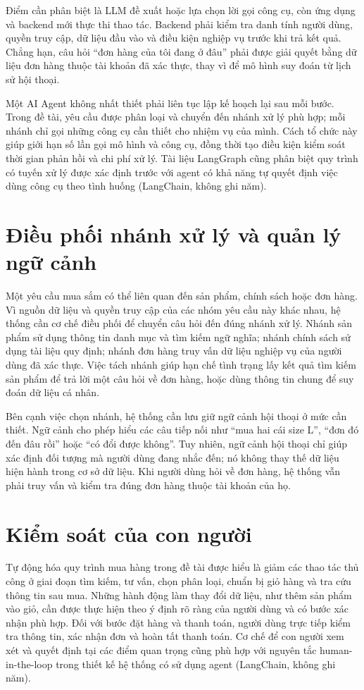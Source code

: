 \documentclass[12pt,a4paper,oneside]{report}
\begin{document}
Điểm cần phân biệt là LLM đề xuất hoặc lựa chọn lời gọi công cụ, còn ứng dụng và backend mới thực thi thao tác. Backend phải kiểm tra danh tính người dùng, quyền truy cập, dữ liệu đầu vào và điều kiện nghiệp vụ trước khi trả kết quả. Chẳng hạn, câu hỏi “đơn hàng của tôi đang ở đâu” phải được giải quyết bằng dữ liệu đơn hàng thuộc tài khoản đã xác thực, thay vì để mô hình suy đoán từ lịch sử hội thoại.

Một AI Agent không nhất thiết phải liên tục lập kế hoạch lại sau mỗi bước. Trong đề tài, yêu cầu được phân loại và chuyển đến nhánh xử lý phù hợp; mỗi nhánh chỉ gọi những công cụ cần thiết cho nhiệm vụ của mình. Cách tổ chức này giúp giới hạn số lần gọi mô hình và công cụ, đồng thời tạo điều kiện kiểm soát thời gian phản hồi và chi phí xử lý. Tài liệu LangGraph cũng phân biệt quy trình có tuyến xử lý được xác định trước với agent có khả năng tự quyết định việc dùng công cụ theo tình huống (LangChain, không ghi năm). \cite{langgraphworkflow}

\section{Điều phối nhánh xử lý và quản lý ngữ cảnh}
Một yêu cầu mua sắm có thể liên quan đến sản phẩm, chính sách hoặc đơn hàng. Vì nguồn dữ liệu và quyền truy cập của các nhóm yêu cầu này khác nhau, hệ thống cần cơ chế điều phối để chuyển câu hỏi đến đúng nhánh xử lý. Nhánh sản phẩm sử dụng thông tin danh mục và tìm kiếm ngữ nghĩa; nhánh chính sách sử dụng tài liệu quy định; nhánh đơn hàng truy vấn dữ liệu nghiệp vụ của người dùng đã xác thực. Việc tách nhánh giúp hạn chế tình trạng lấy kết quả tìm kiếm sản phẩm để trả lời một câu hỏi về đơn hàng, hoặc dùng thông tin chung để suy đoán dữ liệu cá nhân.

Bên cạnh việc chọn nhánh, hệ thống cần lưu giữ ngữ cảnh hội thoại ở mức cần thiết. Ngữ cảnh cho phép hiểu các câu tiếp nối như “mua hai cái size L”, “đơn đó đến đâu rồi” hoặc “có đổi được không”. Tuy nhiên, ngữ cảnh hội thoại chỉ giúp xác định đối tượng mà người dùng đang nhắc đến; nó không thay thế dữ liệu hiện hành trong cơ sở dữ liệu. Khi người dùng hỏi về đơn hàng, hệ thống vẫn phải truy vấn và kiểm tra đúng đơn hàng thuộc tài khoản của họ.

\section{Kiểm soát của con người}
Tự động hóa quy trình mua hàng trong đề tài được hiểu là giảm các thao tác thủ công ở giai đoạn tìm kiếm, tư vấn, chọn phân loại, chuẩn bị giỏ hàng và tra cứu thông tin sau mua. Những hành động làm thay đổi dữ liệu, như thêm sản phẩm vào giỏ, cần được thực hiện theo ý định rõ ràng của người dùng và có bước xác nhận phù hợp. Đối với bước đặt hàng và thanh toán, người dùng trực tiếp kiểm tra thông tin, xác nhận đơn và hoàn tất thanh toán. Cơ chế để con người xem xét và quyết định tại các điểm quan trọng cũng phù hợp với nguyên tắc human-in-the-loop trong thiết kế hệ thống có sử dụng agent (LangChain, không ghi năm). \cite{langgraphinterrupt}
\end{document}
